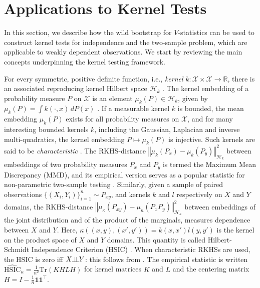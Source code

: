 \section{Applications to Kernel Tests}\label{sec:mmd_hsic}
In this section, we describe how the wild bootstrap for $V$-statistics can be used to construct kernel tests for independence and the two-sample problem, which are applicable to weakly dependent observations. We start by reviewing the main concepts underpinning the kernel testing framework.

For every symmetric, positive definite function, i.e., \emph{kernel} $k:\mathcal{X}\times\mathcal{X}\to\mathbb{R}$,
there is an associated reproducing kernel Hilbert space $\mathcal{H}_{k}$ \cite[p. 19]{BerTho04}.  The kernel embedding of a probability measure
$P$ on $\mathcal{X}$ is an element $\mu_{k}(P)\in\mathcal{H}_{k}$,
given by $\mu_{k}(P)=\int k(\cdot,x)\, dP(x)$ \cite{BerTho04,SmoGreSonSch07}.
If a measurable kernel $k$ is bounded, the mean embedding $\mu_{k}(P)$
exists for all probability measures on $\mathcal{X}$, and for many interesting
bounded kernels $k$, including the Gaussian, Laplacian and inverse
multi-quadratics, the kernel embedding $P\mapsto\mu_{k}(P)$ is injective.
Such kernels are said to be \emph{characteristic} \cite{SriGreFukLanetal10}.
The RKHS-distance $\left\Vert \mu_k(P_x)-\mu_k(P_y)\right\Vert_{{\mathcal H}_k}^2$ between embeddings of two probability measures $P_x$ and $P_y$
is termed the Maximum Mean Discrepancy (MMD), and its empirical version serves as a popular statistic for non-parametric two-sample testing \cite{gretton2012kernel}.
Similarly, given a sample of paired observations $\{(X_i,Y_i)\}_{i=1}^n\sim P_{xy}$, and kernels $k$ and $l$ respectively on $X$ and $Y$ domains, the RKHS-distance 
$\left\Vert \mu_\kappa(P_{xy})-\mu_\kappa(P_x P_y)\right\Vert_{{\mathcal H}_{\kappa}}^2$ between embeddings of the joint distribution and of the product of the marginals, measures dependence between $X$ and $Y$. Here, $\kappa((x,y),(x',y'))=k(x,x')l(y,y')$ is the kernel on the product space of $X$ and $Y$ domains.
This quantity is called Hilbert-Schmidt Independence Criterion (HSIC) \cite{gretton_measuring_2005,gretton_kernel_2008}. When characteristic RKHSs are used, the HSIC is zero iff $X \indep Y$: this follows from \cite{Asimplercondition}.
The  empirical statistic is written $\widehat{\text{HSIC}}_{\kappa} = \frac{1}{n^2}\text{Tr}(KHLH)$ for kernel matrices $K$ and $L$ and the centering matrix $H=I-\frac{1}{n}\mathbf{1}\mathbf{1}^\top$.

